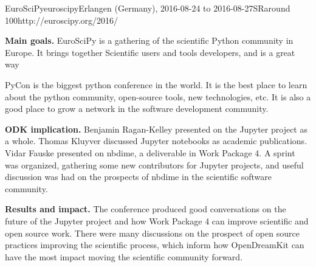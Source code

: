 \begin{event}{EuroSciPy}{euroscipy}{Erlangen (Germany), 2016-08-24 to 2016-08-27}{SR}{around 100}{http://euroscipy.org/2016/}

\textbf{Main goals.} EuroSciPy is a gathering of the scientific Python community in Europe.
It brings together Scientific users and tools developers,
and is a great way

PyCon is the biggest python conference in the world. It is the best place to learn
about the python community, open-source tools, new technologies, etc. It is also a good place
to grow a network in the software development community.

\textbf{ODK implication.} Benjamin Ragan-Kelley presented on the Jupyter project as a whole.
Thomas Kluyver discussed Jupyter notebooks as academic publications.
Vidar Fauske presented on nbdime, a deliverable in Work Package 4.
A sprint was organized, gathering some new contributors for Jupyter projects,
and useful discussion was had on the prospects of nbdime in the scientific software community.

\textbf{Results and impact.} The conference produced good conversations on the future of the Jupyter project and how Work Package 4 can improve scientific and open source work.
There were many discussions on the prospect of open source practices improving the scientific process,
which inform how OpenDreamKit can have the most impact moving the scientific community forward.
\end{event}
